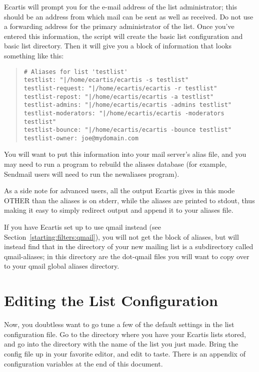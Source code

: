 \documentclass{book}
\begin{document}
Ecartis will prompt you for the e-mail address of the list administrator; this
should be an address from which mail can be sent as well as received. Do not
use a forwarding address for the primary administrator of the list. Once
you've entered this information, the script will create the basic list
configuration and basic list directory. Then it will give you a block of
information that looks something like this:
   
\begin{quote}   
\footnotesize
\begin{verbatim}
# Aliases for list 'testlist'
testlist: "|/home/ecartis/ecartis -s testlist"
testlist-request: "|/home/ecartis/ecartis -r testlist"
testlist-repost: "|/home/ecartis/ecartis -a testlist"
testlist-admins: "|/home/ecartis/ecartis -admins testlist"
testlist-moderators: "|/home/ecartis/ecartis -moderators testlist"
testlist-bounce: "|/home/ecartis/ecartis -bounce testlist"
testlist-owner: joe@mydomain.com
\end{verbatim}
\end{quote}
   
You will want to put this information into your mail server's alias file, and
you may need to run a program to rebuild the aliases database (for example,
Sendmail users will need to run the newaliases program).
   
As a side note for advanced users, all the output Ecartis gives in this mode
OTHER than the aliases is on stderr, while the aliases are printed to stdout,
thus making it easy to simply redirect output and append it to your aliases
file.
   
If you have Ecartis set up to use qmail instead (see
Section~\ref{starting:filters:qmail}), you will not get the block of aliases,
but will instead find that in the directory of your new mailing list is a
subdirectory called qmail-aliases; in this directory are the dot-qmail files
you will want to copy over to your qmail global aliases directory.
   
\section{Editing the List Configuration}
\label{newlist:configure}
   
Now, you doubtless want to go tune a few of the default settings in the list
configuration file.  Go to the directory where you have your Ecartis lists
stored, and go into the directory with the name of the list you just made.
Bring the config file up in your favorite editor, and edit to taste.  There is
an appendix of configuration variables at the end of this document.
   
\end{document}
